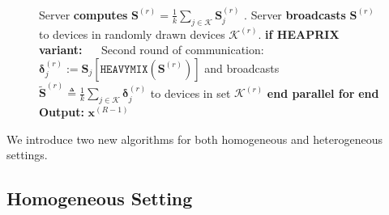 \documentclass{article} %
\begin{document}
\begin{figure}
\begin{minipage}{\linewidth}
\begin{algorithm}[H]
\begin{algorithmic}[1]
\STATE Server \textbf{computes} $ {\mathbf{S}}^{(r)}=\frac{1}{k}\sum_{j\in\mathcal{K}}\mathbf{S}^{(r)}_{j}$ .\label{line:heaprix2}
\STATE Server \textbf{broadcasts} ${\mathbf{S}}^{(r)}$ to devices in randomly drawn devices $\mathcal{K}^{(r)}$.
\vspace{0.1cm}
\STATE \hspace{0.04in} \textbf{if HEAPRIX variant:} 
\STATE $\quad$ Second round of communication: $\mathbf{\delta}_j^{(r)} :=  \mathbf{S}_j\left[\texttt{HEAVYMIX}(\mathbf{S}^{(r)})\right]$ and broadcasts $\tilde{\mathbf{S}}^{(r)}\triangleq\frac{1}{k}\sum_{j\in\mathcal{K}}\mathbf{\delta}_j^{(r)}$ to devices in set $\mathcal{K}^{(r)}$
\vspace{0.1cm}
\STATE \textbf{end parallel for}
\STATE \textbf{end}
\STATE \textbf{Output:} ${\boldsymbol{x}}^{(R-1)}$
\vspace{- 0.1cm}
\end{algorithmic}
\end{algorithm}
\vspace{-0.1in}
\end{minipage}\end{figure}

We introduce two new algorithms for both homogeneous and heterogeneous settings.


\vspace{-0.1in}
\subsection{Homogeneous Setting}
\vspace{-0.05in}
\end{document}
